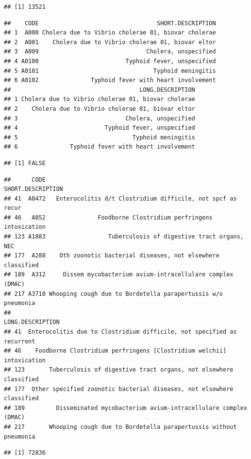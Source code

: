 \documentclass[
]{article}
\begin{document}
\begin{verbatim}
## [1] 13521
\end{verbatim}

\begin{verbatim}
##    CODE                                  SHORT.DESCRIPTION
## 1  A000 Cholera due to Vibrio cholerae 01, biovar cholerae
## 2  A001    Cholera due to Vibrio cholerae 01, biovar eltor
## 3  A009                               Cholera, unspecified
## 4 A0100                         Typhoid fever, unspecified
## 5 A0101                                 Typhoid meningitis
## 6 A0102               Typhoid fever with heart involvement
##                                     LONG.DESCRIPTION
## 1 Cholera due to Vibrio cholerae 01, biovar cholerae
## 2    Cholera due to Vibrio cholerae 01, biovar eltor
## 3                               Cholera, unspecified
## 4                         Typhoid fever, unspecified
## 5                                 Typhoid meningitis
## 6               Typhoid fever with heart involvement
\end{verbatim}

\begin{verbatim}
## [1] FALSE
\end{verbatim}

\begin{verbatim}
##      CODE                                            SHORT.DESCRIPTION
## 41  A0472   Enterocolitis d/t Clostridium difficile, not spcf as recur
## 46   A052               Foodborne Clostridium perfringens intoxication
## 123 A1883                  Tuberculosis of digestive tract organs, NEC
## 177  A288    Oth zoonotic bacterial diseases, not elsewhere classified
## 189  A312     Dissem mycobacterium avium-intracellulare complex (DMAC)
## 217 A3710 Whooping cough due to Bordetella parapertussis w/o pneumonia
##                                                           LONG.DESCRIPTION
## 41  Enterocolitis due to Clostridium difficile, not specified as recurrent
## 46    Foodborne Clostridium perfringens [Clostridium welchii] intoxication
## 123       Tuberculosis of digestive tract organs, not elsewhere classified
## 177  Other specified zoonotic bacterial diseases, not elsewhere classified
## 189         Disseminated mycobacterium avium-intracellulare complex (DMAC)
## 217       Whooping cough due to Bordetella parapertussis without pneumonia
\end{verbatim}

\begin{verbatim}
## [1] 72836
\end{verbatim}
\end{document}
